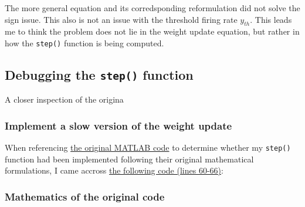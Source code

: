 \documentclass[11pt]{article}
\newenvironment{Shaded}{}{}
\newcommand{\FloatTok}[1]{\textcolor[rgb]{0.25,0.63,0.44}{{#1}}}
\newcommand{\CommentTok}[1]{\textcolor[rgb]{0.38,0.63,0.69}{\textit{{#1}}}}
\newcommand{\NormalTok}[1]{{#1}}
\begin{document}
The more general equation and its corredsponding reformulation did not
solve the sign issue. This also is not an issue with the threshold
firing rate \(y_{th}\). This leads me to think the problem does not lie
in the weight update equation, but rather in how the \texttt{step()}
function is being computed.

\hypertarget{debugging-the-step-function}{%
\subsection{\texorpdfstring{Debugging the \texttt{step()}
function}{Debugging the step() function}}\label{debugging-the-step-function}}

A closer inspection of the origina

\hypertarget{implement-a-slow-version-of-the-weight-update}{%
\subsubsection{Implement a slow version of the weight
update}\label{implement-a-slow-version-of-the-weight-update}}

When referencing
\href{https://github.com/tyangLab/ReservoirNet_OFC_TaskState}{the
original MATLAB code} to determine whether my \texttt{step()} function
had been implemented following their original mathematical formulations,
I came accross
\href{https://github.com/tyangLab/ReservoirNet_OFC_TaskState/blob/master/task1/actRNL.m}{the
following code (lines 60-66)}:

\begin{Shaded}
\end{Shaded}

\hypertarget{mathematics-of-the-original-code}{%
\subsubsection{Mathematics of the original
code}\label{mathematics-of-the-original-code}}
\end{document}
